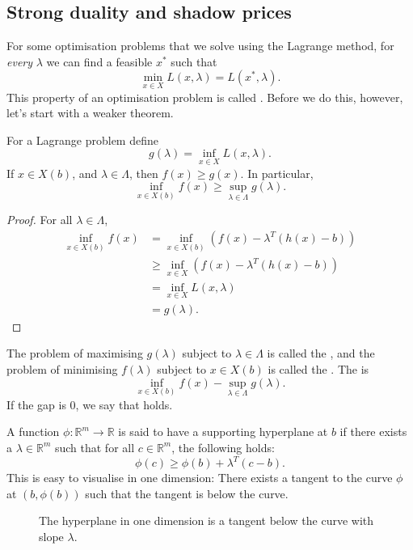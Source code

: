\documentclass[egregdoesnotlikesansseriftitles,a4paper]{scrartcl}
\begin{document}
\subsection{Strong duality and shadow prices}
For some optimisation problems that we solve using the Lagrange method, for \emph{every} $\lambda$ we can find a feasible $x^*$ such that 
\[\min_{x \in X} L (x, \lambda)=L(x^*,\lambda).\]
This property of an optimisation problem is called .
Before we do this, however, let's start with a weaker theorem.
\begin{theorem}
	 For a Lagrange problem define 
	 \[g (\lambda)=\inf_{x \in X}L (x,\lambda).\]
	 If $x \in X (b)$, and $\lambda \in \Lambda$, then $f (x)\geq g (x)$. In particular,
	 \[\inf_{x \in X(b)}f(x) \geq \sup_{\lambda \in \Lambda}g (\lambda).\]
\end{theorem}
\begin{proof}
	For all $\lambda \in \Lambda$,
	 \begin{equation*}
		  \begin{split}
			\inf_{x \in X(b)}f(x)&=\inf_{x \in X(b)}(f(x)- \lambda^T (h(x)-b))\\
			&\geq \inf_{x \in X}(f(x)- \lambda^T (h(x)-b))\\
			&=\inf_{x \in X}L (x,\lambda)\\
			&=g (\lambda).
		  \end{split}
	 \end{equation*}
	 
\end{proof}

The problem of maximising $g (\lambda)$ subject to $\lambda \in \Lambda$ is called the , and the problem of minimising $f (\lambda)$ subject to $x \in X(b)$ is called the .\newline 
The  is 
\[\inf_{x \in X(b)}f(x)- \sup_{\lambda \in \Lambda}g (\lambda).\]
If the gap is 0, we say that  holds.
\begin{definition*}[Hyperplane]
	 A function $\phi: \mathbb{R}^{m} \to \mathbb{R} $ is said to have a supporting hyperplane at $b$ if there exists a $\lambda \in \mathbb{R}^{m}$ such that for all $c \in \mathbb{R}^{m} $, the following holds: 
	 \[\phi(c)\geq \phi (b)+ \lambda^T (c-b).\]
	 This is easy to visualise in one dimension: There exists a tangent to the curve $\phi$ at $(b,\phi(b))$ such that the tangent is below the curve.
	 \begin{figure}[H]
		\centering
		\caption{The hyperplane in one dimension is a tangent below the curve with slope $\lambda$.}
	\end{figure}
\end{definition*}
\end{document}
